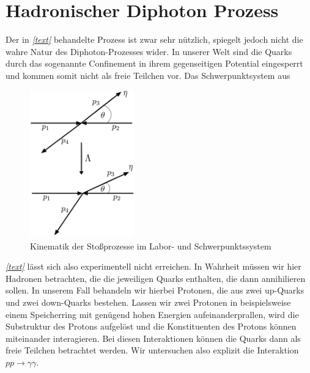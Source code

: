 \section{Hadronischer Diphoton Prozess}
Der in \textit{\autoref{text}} behandelte Prozess ist zwar sehr nützlich, spiegelt jedoch nicht die wahre Natur des Diphoton-Prozesses wider. In unserer Welt sind die Quarks durch das sogenannte Confinement in ihrem gegenseitigen Potential eingesperrt und kommen somit nicht als freie Teilchen vor. Das Schwerpunktsystem  aus 
\begin{figure}
	\includegraphics[width=45mm]{graphics/Kinematik}
	\caption{Kinematik der Stoßprozesse im Labor- und Schwerpunktssystem}
\end{figure}
 \textit{\autoref{text}} lässt sich also experimentell nicht erreichen. In Wahrheit müssen wir hier Hadronen betrachten, die die jeweiligen Quarks enthalten, die dann annihilieren sollen. In unserem Fall behandeln wir hierbei Protonen, die aus zwei up-Quarks und zwei down-Quarks bestehen. Lassen wir zwei Protonen in beispielsweise einem Speicherring mit genügend hohen Energien aufeinanderprallen, wird die Substruktur des Protons aufgelöst und die Konstituenten des Protons können miteinander interagieren. Bei diesen Interaktionen können die Quarks dann als freie Teilchen betrachtet werden. Wir untersuchen also explizit die Interaktion $pp \rightarrow \gamma \gamma$. 

